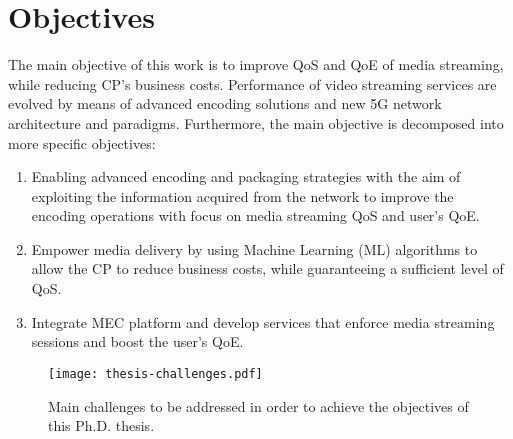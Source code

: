 


\section{Objectives}

The main objective of this work is to improve QoS and QoE of media streaming, while reducing CP's business costs. Performance of video streaming services are evolved by means of advanced encoding solutions and new 5G network architecture and paradigms. Furthermore, the main objective is decomposed into more specific objectives:

\begin{enumerate}
	\item Enabling advanced encoding and packaging strategies with the aim of exploiting the information acquired from the network to improve the encoding operations with focus on media streaming QoS and user's QoE.
	\item Empower media delivery by using Machine Learning (ML) algorithms to allow the CP to reduce business costs, while guaranteeing a sufficient level of QoS.
	\item Integrate MEC platform and develop services that enforce media streaming sessions and boost the user's QoE.
\end{enumerate}

\begin{figure}[htp]
	\centering
	\texttt{[image: thesis-challenges.pdf]}
	\caption{Main challenges to be addressed in order to achieve the objectives of this Ph.D. thesis.}
	\label{fig:objectives}
\end{figure}


